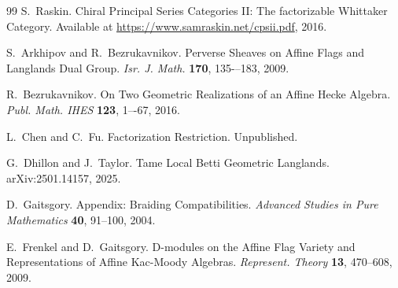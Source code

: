 \documentclass[10pt]{amsart}
\theoremstyle{remark}
\begin{document}
\begin{thebibliography}{99}
 S.~Raskin. Chiral Principal Series Categories II: The factorizable Whittaker Category. Available at \url{https://www.samraskin.net/cpsii.pdf}, 2016.

 S.~Arkhipov and R.~Bezrukavnikov. Perverse Sheaves on Affine Flags and Langlands Dual Group. {\it Isr. J. Math.} {\bf 170}, 135-–183, 2009.

 R.~Bezrukavnikov. On Two Geometric Realizations of an Affine Hecke Algebra. {\it Publ. Math. IHES} {\bf 123}, 1–-67, 2016.

 L.~Chen and C.~Fu. Factorization Restriction. Unpublished.

 G.~Dhillon and J.~Taylor. Tame Local Betti Geometric Langlands. arXiv:2501.14157, 2025.

 D.~Gaitsgory. Appendix: Braiding Compatibilities. {\it Advanced Studies in Pure Mathematics} {\bf 40}, 91--100, 2004.

 E.~Frenkel and D.~Gaitsgory. D-modules on the Affine Flag Variety and Representations of Affine Kac-Moody Algebras. {\it Represent. Theory} {\bf 13}, 470--608, 2009.

\end{thebibliography}
\end{document}
